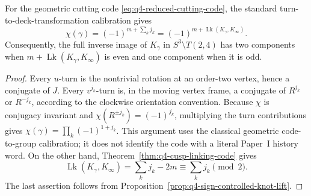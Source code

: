 \begin{corollary}
\label{cor:q4-linking-sign-parity}
For the geometric cutting code
\eqref{eq:q4-reduced-cutting-code}, the standard turn-to-deck-transformation
calibration gives
\begin{equation}
 \chi(\gamma)
 =(-1)^{m+\sum_k j_k}
 =(-1)^{m+\operatorname{Lk}(K_\gamma,K_\infty)}.
 \label{eq:q4-sign-linking-parity}
\end{equation}
Consequently, the full inverse image of \(K_\gamma\) in
\(S^3\setminus T(2,4)\) has two components when
\(m+\operatorname{Lk}(K_\gamma,K_\infty)\) is even and one component when it
is odd.
\end{corollary}

\begin{proof}
Every \(u\)-turn is the nontrivial rotation at an order-two vertex, hence a
conjugate of \(J\).  Every \(v^{j_k}\)-turn is, in the moving vertex frame, a
conjugate of \(R^{j_k}\) or \(R^{-j_k}\), according to the clockwise
orientation convention.  Because \(\chi\) is conjugacy invariant and
\(\chi(R^{\pm j_k})=(-1)^{j_k}\), multiplying the turn contributions gives
\(\chi(\gamma)=\prod_k(-1)^{1+j_k}\).  This argument uses the classical
geometric code-to-group calibration; it does not identify the code with a
literal Paper~I history word.
On the other hand, Theorem~\ref{thm:q4-cusp-linking-code} gives
\[
 \operatorname{Lk}(K_\gamma,K_\infty)
 =\sum_k j_k-2m\equiv\sum_k j_k\pmod2.
\]
The last assertion follows from
Proposition~\ref{prop:q4-sign-controlled-knot-lift}.
\end{proof}

